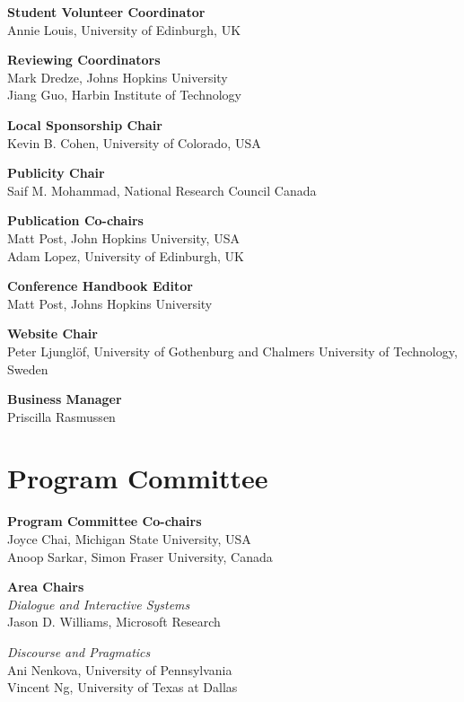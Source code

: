 {\bf Student Volunteer Coordinator} \\
Annie Louis, University of Edinburgh, UK

{\bf Reviewing Coordinators} \\
Mark Dredze, Johns Hopkins University \\
Jiang Guo, Harbin Institute of Technology

{\bf Local Sponsorship Chair} \\
Kevin B. Cohen, University of Colorado, USA

{\bf Publicity Chair} \\
Saif M. Mohammad, National Research Council Canada

{\bf Publication Co-chairs} \\
Matt Post, John Hopkins University, USA \\
Adam Lopez, University of Edinburgh, UK

{\bf Conference Handbook Editor} \\
Matt Post, Johns Hopkins University

{\bf Website Chair} \\
Peter Ljunglöf, University of Gothenburg and Chalmers University of Technology, Sweden

{\bf Business Manager} \\
Priscilla Rasmussen


\section{Program Committee}
\setlength{\parindent}{0pt}

\vspace*{0.5cm}

{\bf Program Committee Co-chairs} \\
Joyce Chai, Michigan State University, USA \\
Anoop Sarkar, Simon Fraser University, Canada

{\bf Area Chairs} \\
\emph{Dialogue and Interactive Systems} \\
\hspace*{0.2in} Jason D. Williams, Microsoft Research

\emph{Discourse and Pragmatics} \\
\hspace*{0.2in} Ani Nenkova, University of Pennsylvania \\
\hspace*{0.2in} Vincent Ng, University of Texas at Dallas 

